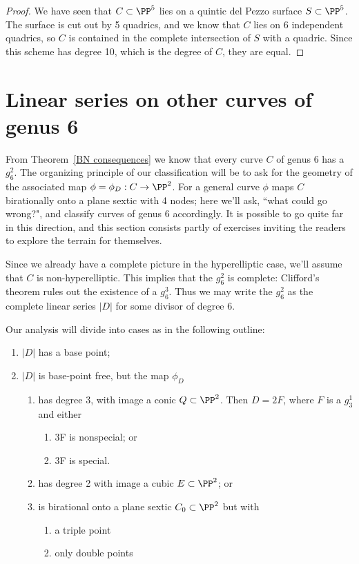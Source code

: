 \begin{proof}
We have seen that $C \subset \PP^5$ lies on a quintic del Pezzo surface $S \subset \PP^5$. The surface is cut out by 5 quadrics, and we know that $C$ lies on 6 independent quadrics,
so $C$ is contained in the complete intersection of $S$ with a quadric. Since this scheme has degree 10, which is the degree of $C$, they are equal.
\end{proof}


\section{Linear series on other curves of genus 6}

From Theorem~\ref{BN consequences}  we know that every curve $C$ of genus 6 has a $g^{2}_{6}$. The organizing principle of our classification will be to ask for the geometry of the associated map $\phi = \phi_D : C \to \PP^2$. For a general curve  $\phi$ maps $C$ birationally onto a plane sextic with 4 nodes; here we'll ask, ``what could go wrong?", and classify curves of genus 6 accordingly. It is possible to go quite far 
in this direction, and this section consists partly of exercises inviting the readers to explore the terrain for themselves.

Since we already have a complete picture in the hyperelliptic case, we'll assume that $C$ is non-hyperelliptic. This implies that  the $g^2_6$ is complete: Clifford's theorem rules out
the existence of a $g^3_6$. Thus we may write the $g^{2}_{6}$ as the complete linear series
$|D|$ for some divisor of degree 6.


Our analysis will divide into cases as in the following outline:
\begin{enumerate}
 \item $|D|$ has a base point;
 \item $|D|$ is base-point free, but the map $\phi_{D}$
 
\begin{enumerate}
\item has degree 3, with image a conic $Q \subset \PP^2$. Then $D= 2F$, where $F$ is a $g^{1}_{3}$ and either
\begin{enumerate}
 \item 3F is nonspecial; or
 \item 3F is special.
\end{enumerate}
\item has degree 2 with image a cubic  $E \subset \PP^2$; or
\item is birational onto a plane sextic $C_0\subset \PP^2$ but with 
\begin{enumerate}
 \item a triple point
 \item only double points
\end{enumerate}
\end{enumerate}
\end{enumerate}


